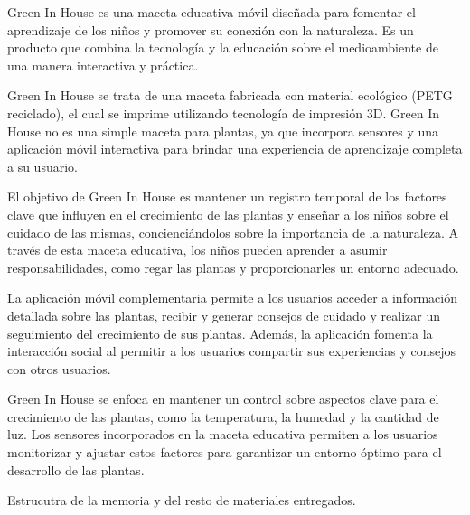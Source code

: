 
Green In House es una maceta educativa móvil diseñada para fomentar el aprendizaje de los niños y promover su conexión con la naturaleza. Es un producto que combina la tecnología y la educación sobre el medioambiente de una manera interactiva y práctica.

Green In House se trata de una maceta fabricada con material ecológico (PETG reciclado), el cual se imprime utilizando tecnología de impresión 3D. Green In House no es una simple maceta para plantas, ya que incorpora sensores y una aplicación móvil interactiva para brindar una experiencia de aprendizaje completa a su usuario.

El objetivo de Green In House es mantener un registro temporal de los factores clave que influyen en el crecimiento de las plantas y enseñar a los niños sobre el cuidado de las mismas, concienciándolos sobre la importancia de la naturaleza. A través de esta maceta educativa, los niños pueden aprender a asumir responsabilidades, como regar las plantas y proporcionarles un entorno adecuado.

La aplicación móvil complementaria permite a los usuarios acceder a información detallada sobre las plantas, recibir y generar consejos de cuidado y realizar un seguimiento del crecimiento de sus plantas. Además, la aplicación fomenta la interacción social al permitir a los usuarios compartir sus experiencias y consejos con otros usuarios.

Green In House se enfoca en mantener un control sobre aspectos clave para el crecimiento de las plantas, como la temperatura, la humedad y la cantidad de luz. Los sensores incorporados en la maceta educativa permiten a los usuarios monitorizar y ajustar estos factores para garantizar un entorno óptimo para el desarrollo de las plantas.





Estrucutra de la memoria y del resto de materiales entregados.
